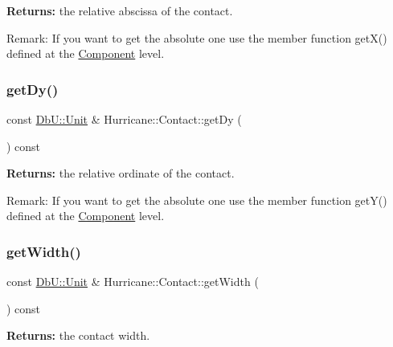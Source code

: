 {\bfseries Returns\+:} the relative abscissa of the contact.

\begin{DoxyParagraph}{Remark\+:}
If you want to get the absolute one use the member function get\+X() defined at the \hyperlink{classHurricane_1_1Component}{Component} level. 
\end{DoxyParagraph}
\mbox{\label{classHurricane_1_1Contact_aa7bc32ab9211fd5f6ad3aacdf1214f20}} 
\subsubsection{\texorpdfstring{get\+Dy()}{getDy()}}
{\footnotesize\ttfamily const \hyperlink{group__DbUGroup_ga4fbfa3e8c89347af76c9628ea06c4146}{Db\+U\+::\+Unit} \& Hurricane\+::\+Contact\+::get\+Dy (\begin{DoxyParamCaption}{ }\end{DoxyParamCaption}) const\hspace{0.3cm}{\ttfamily [inline]}}

{\bfseries Returns\+:} the relative ordinate of the contact.

\begin{DoxyParagraph}{Remark\+:}
If you want to get the absolute one use the member function get\+Y() defined at the \hyperlink{classHurricane_1_1Component}{Component} level. 
\end{DoxyParagraph}
\mbox{\label{classHurricane_1_1Contact_a28bd18de9ca6e5cf2b77fce5e22af43a}} 
\subsubsection{\texorpdfstring{get\+Width()}{getWidth()}}
{\footnotesize\ttfamily const \hyperlink{group__DbUGroup_ga4fbfa3e8c89347af76c9628ea06c4146}{Db\+U\+::\+Unit} \& Hurricane\+::\+Contact\+::get\+Width (\begin{DoxyParamCaption}{ }\end{DoxyParamCaption}) const\hspace{0.3cm}{\ttfamily [inline]}}

{\bfseries Returns\+:} the contact width. \mbox{\label{classHurricane_1_1Contact_a4a5136f4e8299435e50db7da28172ca1}} 
